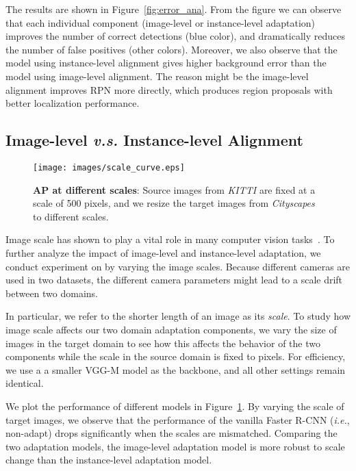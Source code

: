 \documentclass[10pt,twocolumn,letterpaper]{article}
\def\ie{\emph{i.e.}}
\def\cs{\textit{Cityscapes} }
\def\kitti{\textit{KITTI} }
\begin{document}
The results are shown in Figure~\ref{fig:error_ana}. From the figure we can observe that each individual component (image-level or instance-level adaptation) improves the number of correct detections (blue color), and dramatically reduces the number of false positives (other colors). Moreover, we also observe that the model using instance-level alignment gives higher background error than the model using image-level alignment. The reason might be the image-level alignment improves RPN more directly, which produces region proposals with better localization performance.

\subsection{Image-level \textit{v.s.} Instance-level Alignment}
\begin{figure}
\centering
\texttt{[image: images/scale\_curve.eps]}
\hspace{1mm}
\caption{\textbf{AP at different scales}: Source images from \kitti are fixed at a scale of 500 pixels, and we resize the target images from \cs to different scales. }
\label{fig:scale_curve}
\vspace{-5mm}
\end{figure}

Image scale has shown to play a vital role in many computer vision tasks~\cite{chen2016scale,chen2016attention,SR4VTs}. To further analyze the impact of image-level and instance-level adaptation, we conduct experiment on  by varying the image scales. Because different cameras are used in two datasets, the different camera parameters might lead to a scale drift between two domains.

In particular, we refer to the shorter length of an image as its \textit{scale}. To study how image scale affects our two domain adaptation components, we vary the size of images in the target domain to see how this affects the behavior of the two components while the scale in the source domain is fixed to  pixels. For efficiency, we use a a smaller VGG-M model as the backbone, and all other settings remain identical. 

We plot the performance of different models in Figure~\ref{fig:scale_curve}. By varying the  scale of target images, we observe that the performance of the vanilla Faster R-CNN (\ie, non-adapt) drops significantly when the scales are mismatched. Comparing the two adaptation models, the image-level adaptation model is more robust to scale change than the instance-level adaptation model. 
\end{document}
